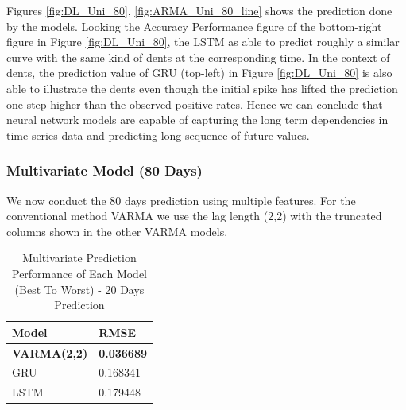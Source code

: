 Figures \ref{fig:DL_Uni_80}, \ref{fig:ARMA_Uni_80_line} shows the prediction done by the models. Looking the Accuracy Performance figure of the bottom-right figure in Figure \ref{fig:DL_Uni_80}, the LSTM as able to predict roughly a similar curve with the same kind of dents at the corresponding time. In the context of dents, the prediction value of GRU (top-left) in Figure \ref{fig:DL_Uni_80} is also able to illustrate the dents even though the initial spike has lifted the prediction one step higher than the observed positive rates. Hence we can conclude that neural network models are capable of capturing the long term dependencies in time series data and predicting long sequence of future values.

\subsubsection{Multivariate Model (80 Days)}
We now conduct the 80 days prediction using multiple features. For the conventional method VARMA we use the lag length (2,2) with the truncated columns shown in the other VARMA models. 
\begin{table}[h]
\caption{Multivariate Prediction Performance of Each Model (Best To Worst) - 20 Days Prediction}
    \label{tab:80Mult}
    \centering
    \begin{tabular}{ |p{3cm}||p{3cm}| }
        \hline
         Model &  RMSE\\
        \hline
        \textbf{VARMA(2,2)} & \textbf{0.036689}\\
        GRU  & 0.168341\\
        LSTM  & 0.179448\\
    \hline
    \end{tabular}
\end{table}
